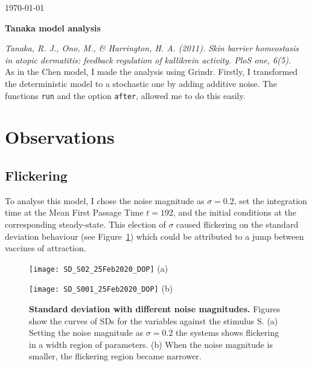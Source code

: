\documentclass[12pt,twoside]{book}
\begin{document}
\today

\begin{center}
\Large{\textbf{Tanaka model analysis}}\\
\end{center}

\textit{Tanaka, R. J., Ono, M., \& Harrington, H. A. (2011). Skin barrier homeostasis in atopic dermatitis: feedback regulation of kallikrein activity. PloS one, 6(5).}\\

As in the Chen model, I made the analysis using Grindr. Firstly, I transformed the deterministic model to a stochastic one by adding additive noise. The functions \verb|run| and the option \verb|after|, allowed me to do this easily.

\section*{Observations}

\subsection*{Flickering}

To analyse this model, I chose the noise magnitude as $\sigma = 0.2$, set the integration time at the Mean First Passage Time $t = 192$, and the initial conditions at the corresponding steady-state. This election of $\sigma$ caused flickering on the standard deviation behaviour (see Figure~\ref{HighSD}) which could be attributed to a jump between vaccines of attraction.\\
 

\begin{figure}[h]
\begin{minipage}[b]{0.5\linewidth}
\centering
\texttt{[image: SD\_S02\_25Feb2020\_DOP]}
    \small{(a)} 
\end{minipage}
\hspace{0.5cm}
\begin{minipage}[b]{0.5\linewidth}
\centering
\texttt{[image: SD\_S001\_25Feb2020\_DOP]}
    \small{(b)} 
\end{minipage}
\caption{\textbf{Standard deviation with different noise magnitudes.} Figures show the curves of SDs for the variables against the stimulus S. (a) Setting the noise magnitude as $\sigma=0.2$ the systems shows flickering in a width region of parameters. (b) When the noise magnitude is smaller, the flickering region became narrower.}
\label{HighSD}
\end{figure}
\end{document}
